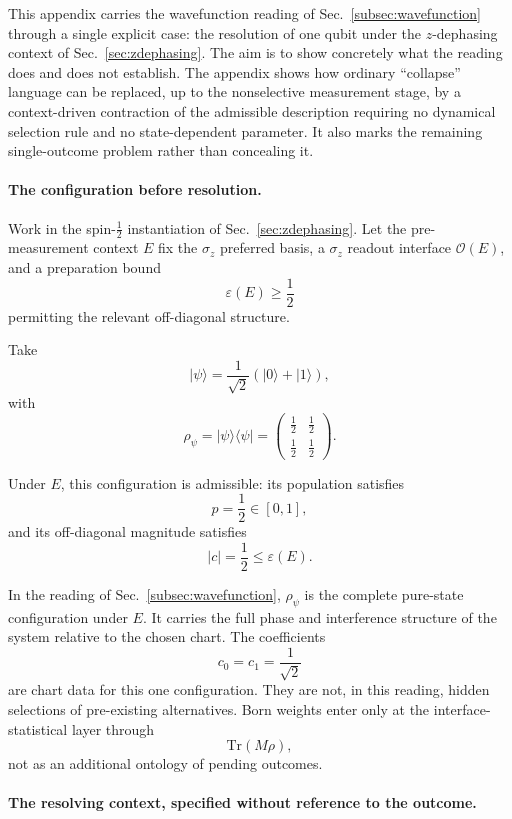 \documentclass[aps,prx,onecolumn,11pt]{revtex4-2}
\theoremstyle{plain}
\theoremstyle{definition}
\theoremstyle{remark}
\begin{document}
This appendix carries the wavefunction reading of
Sec.~\ref{subsec:wavefunction} through a single explicit case: the
resolution of one qubit under the \(z\)-dephasing context of
Sec.~\ref{sec:zdephasing}. The aim is to show concretely what the
reading does and does not establish. The appendix shows how ordinary
``collapse'' language can be replaced, up to the nonselective
measurement stage, by a context-driven contraction of the admissible
description requiring no dynamical selection rule and no state-dependent
parameter. It also marks the remaining single-outcome problem rather
than concealing it.

\paragraph{The configuration before resolution.}

Work in the spin-\(\tfrac12\) instantiation of
Sec.~\ref{sec:zdephasing}. Let the pre-measurement context \(E\) fix
the \(\sigma_z\) preferred basis, a \(\sigma_z\) readout interface
\(\mathcal O(E)\), and a preparation bound
\[
\varepsilon(E)\geq \frac12
\]
permitting the relevant off-diagonal structure.

Take
\[
|\psi\rangle
=
\frac{1}{\sqrt2}
\left(
|0\rangle+|1\rangle
\right),
\]
with
\begin{equation}
\rho_\psi
=
|\psi\rangle\langle\psi|
=
\begin{pmatrix}
\tfrac12 & \tfrac12 \\[2pt]
\tfrac12 & \tfrac12
\end{pmatrix}.
\label{eq:appendixE_pre_resolution_state}
\end{equation}

Under \(E\), this configuration is admissible: its population satisfies
\[
p=\frac12\in[0,1],
\]
and its off-diagonal magnitude satisfies
\[
|c|=\frac12\leq\varepsilon(E).
\]

In the reading of Sec.~\ref{subsec:wavefunction}, \(\rho_\psi\) is the
complete pure-state configuration under \(E\). It carries the full
phase and interference structure of the system relative to the chosen
chart. The coefficients
\[
c_0=c_1=\frac{1}{\sqrt2}
\]
are chart data for this one configuration. They are not, in this
reading, hidden selections of pre-existing alternatives. Born weights
enter only at the interface-statistical layer through
\[
\mathrm{Tr}(M\rho),
\]
not as an additional ontology of pending outcomes.

\paragraph{The resolving context, specified without reference to the outcome.}
\end{document}
